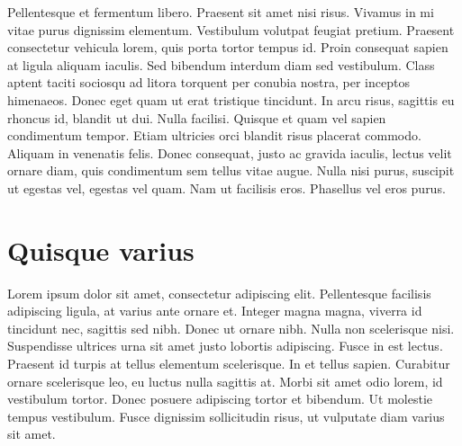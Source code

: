 Pellentesque et fermentum libero. Praesent sit amet nisi risus. Vivamus in mi vitae purus dignissim elementum. Vestibulum volutpat feugiat pretium. Praesent consectetur vehicula lorem, quis porta tortor tempus id. Proin consequat sapien at ligula aliquam iaculis. Sed bibendum interdum diam sed vestibulum. Class aptent taciti sociosqu ad litora torquent per conubia nostra, per inceptos himenaeos. Donec eget quam ut erat tristique tincidunt. In arcu risus, sagittis eu rhoncus id, blandit ut dui. Nulla facilisi. Quisque et quam vel sapien condimentum tempor. Etiam ultricies orci blandit risus placerat commodo. Aliquam in venenatis felis. Donec consequat, justo ac gravida iaculis, lectus velit ornare diam, quis condimentum sem tellus vitae augue. Nulla nisi purus, suscipit ut egestas vel, egestas vel quam. Nam ut facilisis eros. Phasellus vel eros purus.

\chapter{Quisque varius}

Lorem ipsum dolor sit amet, consectetur adipiscing elit. Pellentesque facilisis adipiscing ligula, at varius ante ornare et. Integer magna magna, viverra id tincidunt nec, sagittis sed nibh. Donec ut ornare nibh. Nulla non scelerisque nisi. Suspendisse ultrices urna sit amet justo lobortis adipiscing. Fusce in est lectus. Praesent id turpis at tellus elementum scelerisque. In et tellus sapien. Curabitur ornare scelerisque leo, eu luctus nulla sagittis at. Morbi sit amet odio lorem, id vestibulum tortor. Donec posuere adipiscing tortor et bibendum. Ut molestie tempus vestibulum. Fusce dignissim sollicitudin risus, ut vulputate diam varius sit amet. 
